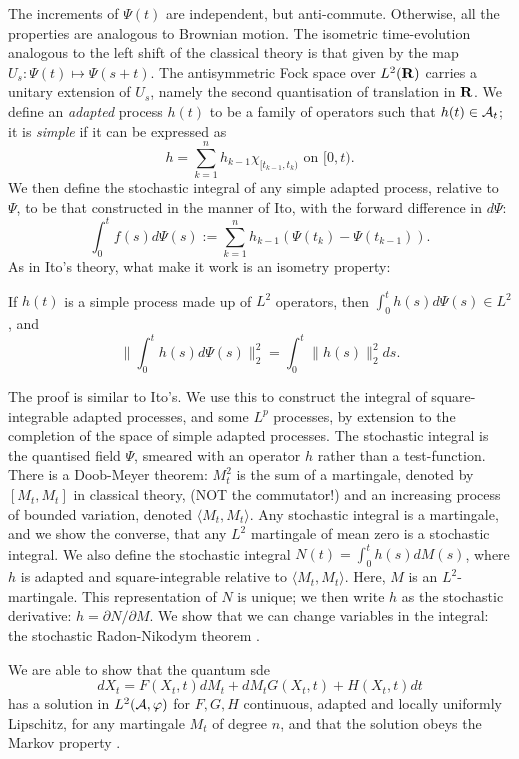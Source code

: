 The increments of $\Psi(t)$ are independent, but anti-commute. Otherwise, all
the properties are analogous to Brownian motion. The isometric time-evolution
analogous to the left shift of the classical theory is that given by the map
$U_s:\Psi(t)\mapsto \Psi(s+t)$. The antisymmetric Fock space over
$L^2({\bf R})$ carries a unitary extension of $U_s$, namely the second
quantisation of translation in ${\bf R}$.
We define an {\em adapted} process $h(t)$ to be a family of operators
such that $h(t)\in{\cal A}_t$; it is {\em simple} if it can be expressed
as
\begin{equation}
h=\sum_{k=1}^n h_{k-1}\chi_{[t_{k-1},t_k)}\mbox{ on }[0,t).
\end{equation}
We then define the stochastic integral of any simple adapted process,
relative to $\Psi$, to be that constructed in the manner of Ito,
with the forward difference in $d\Psi$:
\begin{equation}
\int_0^t f(s)d\Psi(s):=\sum_{k=1}^n h_{k-1}\left(\Psi(t_k)-\Psi(t_{k-1})
\right).
\label{Itoclifford}
\end{equation}
As in Ito's theory, what make it work is an isometry property:
\begin{theorem}
If $h(t)$ is a simple process made up of $L^2$ operators, then $\int_0^t
h(s)d\Psi(s)\in L^2$, and
\[\|\int_0^th(s)d\Psi(s)\|_2^2=\int_0^t\|h(s)\|_2^2ds.\]
\end{theorem}
The proof \cite{Barnett2} is similar to Ito's.
We use this to construct the integral of square-integrable adapted processes,
and some $L^p$ processes, by extension to the completion of the space of
simple adapted processes. The stochastic integral is the quantised field
$\Psi$, smeared with an operator $h$ rather than a test-function.
There is a Doob-Meyer theorem: $M_t^2$ is the sum of a martingale, denoted by
$[M_t,M_t]$ in classical theory, (NOT the commutator!) and an increasing
process of bounded variation, denoted $\langle M_t,M_t\rangle$.
Any stochastic integral is a martingale, and
we show the converse, that any $L^2$ martingale of mean zero is a
stochastic integral.
We also define the stochastic integral $N(t)=\int_0^th(s)
dM(s)$, where $h$ is adapted and square-integrable relative to $\langle M_t,
M_t\rangle$. Here,
$M$ is an $L^2$-martingale. This representation of
$N$ is unique; we then write $h$ as the stochastic derivative: $h=\partial
N/\partial M$. We show that we can change variables in the
integral: the stochastic Radon-Nikodym theorem \cite{Barnett}.

We are able to show \cite{Barnett5} that the quantum sde
\begin{equation}
dX_t=F(X_t,t)dM_t+dM_tG(X_t,t)+H(X_t,t)dt
\end{equation}
has a solution in $L^2({\cal A},\varphi)$ for $F,G,H$ continuous, adapted
and locally uniformly Lipschitz, for any martingale $M_t$ of degree $n$,
and that the solution obeys the Markov property \cite{Barnett6}.

